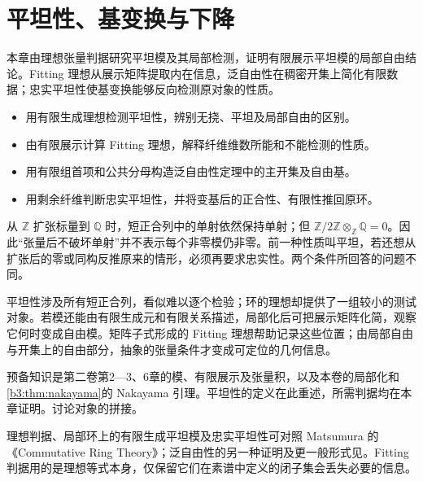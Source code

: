 
\chapter{平坦性、基变换与下降}
\label{b3:ch:12}

\begin{chapterabstract}
	本章由理想张量判据研究平坦模及其局部检测，证明有限展示平坦模的局部自由结论。Fitting 理想从展示矩阵提取内在信息，泛自由性在稠密开集上简化有限数据；忠实平坦性使基变换能够反向检测原对象的性质。
\end{chapterabstract}

\begin{learninggoals}
	\begin{itemize}
		\item 用有限生成理想检测平坦性，辨别无挠、平坦及局部自由的区别。
		\item 由有限展示计算 Fitting 理想，解释纤维维数所能和不能检测的性质。
		\item 用有限组首项和公共分母构造泛自由性定理中的主开集及自由基。
		\item 用剩余纤维判断忠实平坦性，并将变基后的正合性、有限性推回原环。
	\end{itemize}
\end{learninggoals}

从 \(\mathbb Z\) 扩张标量到 \(\mathbb Q\) 时，短正合列中的单射依然保持单射；但 \(\mathbb Z/2\mathbb Z\otimes_{\mathbb Z}\mathbb Q=0\)。因此“张量后不破坏单射”并不表示每个非零模仍非零。前一种性质叫平坦，若还想从扩张后的零或同构反推原来的情形，必须再要求忠实性。两个条件所回答的问题不同。

\ProseParagraphBreak

平坦性涉及所有短正合列，看似难以逐个检验；环的理想却提供了一组较小的测试对象。若模还能由有限生成元和有限关系描述，局部化后可把展示矩阵化简，观察它何时变成自由模。矩阵子式形成的 Fitting 理想帮助记录这些位置；由局部自由与开集上的自由部分，抽象的张量条件才变成可定位的几何信息。

\ProseParagraphBreak

预备知识是第二卷第2—3、6章的模、有限展示及张量积，以及本卷的局部化和\cref{b3:thm:nakayama}的 Nakayama 引理。平坦性的定义在此重述，所需判据均在本章证明。讨论对象的拼接。

\ProseParagraphBreak
理想判据、局部环上的有限生成平坦模及忠实平坦性可对照 Matsumura 的《Commutative Ring Theory》\cite[\S7, Theorems 7.2--7.10, pp. 47--52]{Matsumura1989CommutativeRingTheory}；泛自由性的另一种证明及更一般形式见\cite[\S24, Theorem 24.1, p. 186]{Matsumura1989CommutativeRingTheory}。Fitting 判据用的是理想等式本身，仅保留它们在素谱中定义的闭子集会丢失必要的信息。


